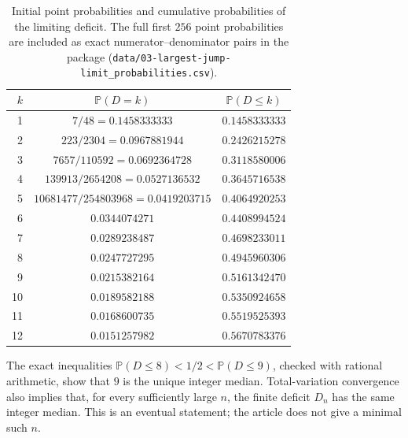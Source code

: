 \documentclass[11pt,a4paper]{article}
\theoremstyle{definition}\newaliascnt{definition}{theorem}
\theoremstyle{remark}\newaliascnt{remark}{theorem}
\newcommand{\ljP}{\mathbb P}
\begin{document}
\begin{table}[tbp]
\centering
\caption{Initial point probabilities and cumulative probabilities of the
limiting deficit. The full first $256$ point probabilities are included
as exact numerator--denominator pairs in the package
(\texttt{data/03-largest-jump-limit\_probabilities.csv}).}
\label{lj:tab:probabilities}
\begin{tabular}{rcc}
\toprule
$k$ & $\ljP(D=k)$ & $\ljP(D\le k)$\\
\midrule
1 & $7/48=0.1458333333$ & $0.1458333333$\\
2 & $223/2304=0.0967881944$ & $0.2426215278$\\
3 & $7657/110592=0.0692364728$ & $0.3118580006$\\
4 & $139913/2654208=0.0527136532$ & $0.3645716538$\\
5 & $10681477/254803968=0.0419203715$ & $0.4064920253$\\
6 & $0.0344074271$ & $0.4408994524$\\
7 & $0.0289238487$ & $0.4698233011$\\
8 & $0.0247727295$ & $0.4945960306$\\
9 & $0.0215382164$ & $0.5161342470$\\
10 & $0.0189582188$ & $0.5350924658$\\
11 & $0.0168600735$ & $0.5519525393$\\
12 & $0.0151257982$ & $0.5670783376$\\
\bottomrule
\end{tabular}
\end{table}

The exact inequalities
$\ljP(D\le8)<1/2<\ljP(D\le9)$, checked with rational arithmetic,
show that $9$ is the unique integer median. Total-variation convergence
also implies that, for every sufficiently large $n$, the finite deficit
$D_n$ has the same integer median. This is an eventual statement; the
article does not give a minimal such $n$.
\end{document}
